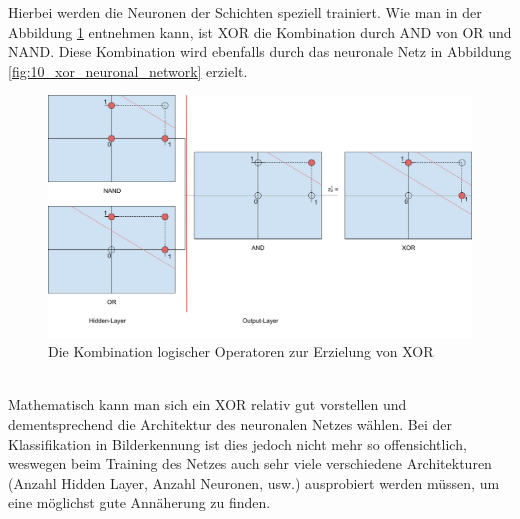 Hierbei werden die Neuronen der Schichten speziell trainiert. Wie man in der Abbildung \ref{fig:11_xor_neuronal_network_operator}
entnehmen kann, ist \glqq XOR\grqq{} die Kombination durch \glqq AND\grqq{} von \glqq OR\grqq{} und \glqq NAND\grqq{}.
Diese Kombination wird ebenfalls durch das neuronale Netz in Abbildung \ref{fig:10_xor_neuronal_network} erzielt.
\begin{figure}[h!]
    \begin{center}
        \includegraphics[width=1\linewidth]{../common/01_neuronal_network/00_resources/07_xor_neuronal_network_logical.png}
    \end{center}
    \caption{Die Kombination logischer Operatoren zur Erzielung von XOR}
    \label{fig:11_xor_neuronal_network_operator}
\end{figure}
\\

Mathematisch kann man sich ein \glqq XOR\grqq{} relativ gut vorstellen und dementsprechend die Architektur des neuronalen
Netzes wählen. Bei der Klassifikation in Bilderkennung ist dies jedoch nicht mehr so offensichtlich, weswegen beim Training des
Netzes auch sehr viele verschiedene Architekturen (Anzahl Hidden Layer, Anzahl Neuronen, usw.) ausprobiert werden müssen,
um eine möglichst gute Annäherung zu finden.